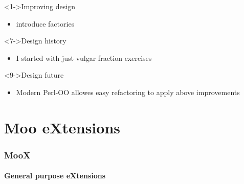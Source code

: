 \documentclass[ngerman,xcolor={table,dvipsnames},smaller,compress,hyperref={bookmarks,colorlinks}]{beamer}
\begin{document}
\begin{frame}[t,fragile]

\begin{block}<1->{Improving design}
\begin{itemize}
\item introduce factories
\end{itemize}
\end{block}

\begin{block}<7->{Design history}
\begin{itemize}
\item I started with just vulgar fraction exercises
\end{itemize}
\end{block}

\begin{block}<9->{Design future}
\begin{itemize}
\item Modern Perl-OO allowes easy refactoring to apply above improvements
\end{itemize}
\end{block}

\end{frame}

\part{Moo eXtensions}

\section{MooX}

\subsection{General purpose eXtensions}
\end{document}
